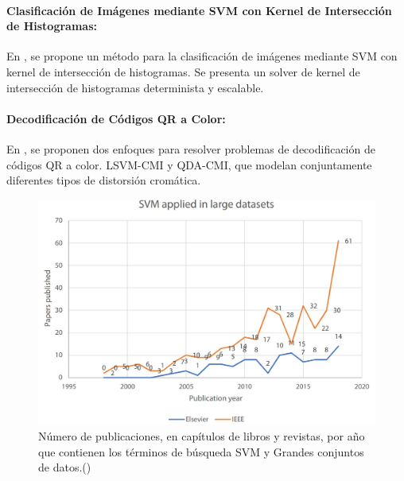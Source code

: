 \paragraph{Clasificación de Imágenes mediante SVM con Kernel de Intersección de Histogramas:} En \cite{svmm6}, se propone un método para la clasificación de imágenes mediante SVM con kernel de intersección de histogramas. Se presenta un solver de kernel de intersección de histogramas determinista y escalable.

\paragraph{Decodificación de Códigos QR a Color:} En \cite{svmm7}, se proponen dos enfoques para resolver problemas de decodificación de códigos QR a color. LSVM-CMI y QDA-CMI, que modelan conjuntamente diferentes tipos de distorsión cromática.


\begin{figure}[H]
\begin{center}
	\includegraphics[width=1\textwidth]{2/figures/svm5.jpeg}
	\caption{Número de publicaciones, en capítulos de libros y revistas, por año que contienen los términos de búsqueda SVM y Grandes conjuntos de datos.(\cite{tecnica3})}
\end{center}
\end{figure}

